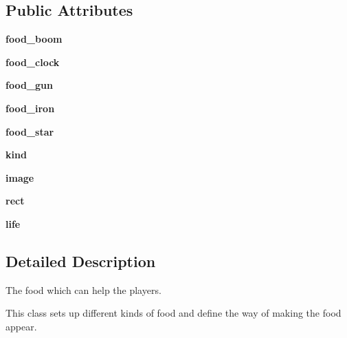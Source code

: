 \subsection*{Public Attributes}
\begin{DoxyCompactItemize}
\item 
\mbox{\label{classfood_1_1_food_a68a823dd7b6a2efed9c92769746d994d}} 
{\bfseries food\+\_\+boom}
\item 
\mbox{\label{classfood_1_1_food_af454a34e00d1318966af2da70a22a5d7}} 
{\bfseries food\+\_\+clock}
\item 
\mbox{\label{classfood_1_1_food_a02776b54f98b4f106f5ea6d9038e0147}} 
{\bfseries food\+\_\+gun}
\item 
\mbox{\label{classfood_1_1_food_a57326df5c7b48e90028cd08d42b7decd}} 
{\bfseries food\+\_\+iron}
\item 
\mbox{\label{classfood_1_1_food_a7a6f9219b100e4165c0f202b9a7d4182}} 
{\bfseries food\+\_\+star}
\item 
\mbox{\label{classfood_1_1_food_a5794deff46aaaa2bc44a0e4ce9a95fe9}} 
{\bfseries kind}
\item 
\mbox{\label{classfood_1_1_food_a4ff4fc2a2b83aa5df31bb9b0e991a839}} 
{\bfseries image}
\item 
\mbox{\label{classfood_1_1_food_a82b4a9ecc49101900af6b0bb737d287d}} 
{\bfseries rect}
\item 
\mbox{\label{classfood_1_1_food_a79d9c0f6c7f9c78a38a4b2bd95d4b331}} 
{\bfseries life}
\end{DoxyCompactItemize}


\subsection{Detailed Description}
The food which can help the players. 

This class sets up different kinds of food and define the way of making the food appear. 

